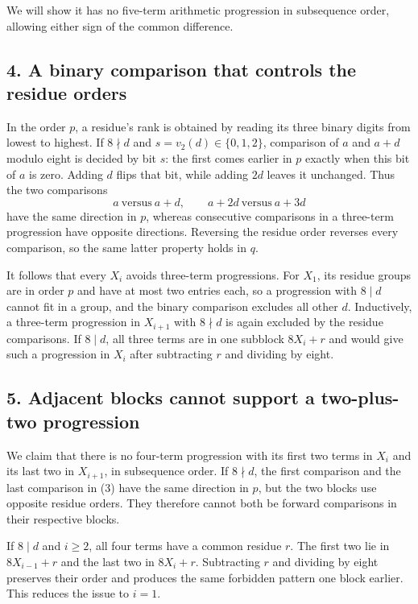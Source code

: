 We will show it has no five-term arithmetic progression in subsequence order, allowing either sign of the common difference.

\subsection*{4. A binary comparison that controls the residue orders}
In the order $p$, a residue's rank is obtained by reading its three binary digits from lowest to highest. If $8\nmid d$ and $s=v_2(d)\in\{0,1,2\}$, comparison of $a$ and $a+d$ modulo eight is decided by bit $s$: the first comes earlier in $p$ exactly when this bit of $a$ is zero. Adding $d$ flips that bit, while adding $2d$ leaves it unchanged. Thus the two comparisons
\[
 a\ \text{versus}\ a+d,
 \qquad a+2d\ \text{versus}\ a+3d
\tag{3}
\]
have the same direction in $p$, whereas consecutive comparisons in a three-term progression have opposite directions. Reversing the residue order reverses every comparison, so the same latter property holds in $q$.

It follows that every $X_i$ avoids three-term progressions. For $X_1$, its residue groups are in order $p$ and have at most two entries each, so a progression with $8\mid d$ cannot fit in a group, and the binary comparison excludes all other $d$. Inductively, a three-term progression in $X_{i+1}$ with $8\nmid d$ is again excluded by the residue comparisons. If $8\mid d$, all three terms are in one subblock $8X_i+r$ and would give such a progression in $X_i$ after subtracting $r$ and dividing by eight.

\subsection*{5. Adjacent blocks cannot support a two-plus-two progression}
We claim that there is no four-term progression with its first two terms in $X_i$ and its last two in $X_{i+1}$, in subsequence order. If $8\nmid d$, the first comparison and the last comparison in (3) have the same direction in $p$, but the two blocks use opposite residue orders. They therefore cannot both be forward comparisons in their respective blocks.

If $8\mid d$ and $i\ge2$, all four terms have a common residue $r$. The first two lie in $8X_{i-1}+r$ and the last two in $8X_i+r$. Subtracting $r$ and dividing by eight preserves their order and produces the same forbidden pattern one block earlier. This reduces the issue to $i=1$.


